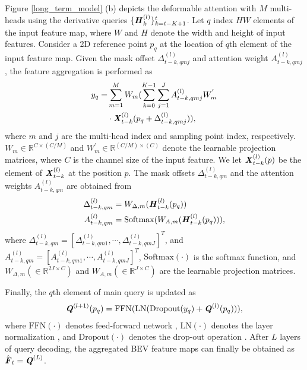 \documentclass[letterpaper]{article} \usepackage{aaai23}  \usepackage{times}  \usepackage{helvet}  \usepackage{courier}  \usepackage[hyphens]{url}  \usepackage{graphicx} \urlstyle{rm} \def\UrlFont{\rm}  \usepackage{natbib}  \usepackage{caption} \frenchspacing  \setlength{\pdfpagewidth}{8.5in} \usepackage{algorithm}
\begin{document}
Figure \ref{long_term_model} (b) depicts the deformable attention with $M$ multi-heads using the derivative queries $\{\textbf{\textit{H}}_{k}^{(l)}\}_{k=t-K+1}^{t}$. 
Let $q$ index $HW$ elements of the input feature map, where $W$ and $H$ denote the width and height of input features. Consider a 2D reference point $p_q$ at the location of $q$th element of the input feature map.
Given the mask offset $\Delta_{t-k,qmj}^{(l)}$ and attention weight $A_{t-k, qmj}^{(l)}$, the feature aggregation is performed as
\begin{align}
    y_q =& \sum_{m=1}^{M}W_m(\sum_{k=0}^{K-1}\sum_{j=1}^{J}A_{t-k, qmj}^{(l)}W_m^{'}  \nonumber \\
    &\cdot \textbf{\textit{X}}_{t-k}^{(l)}(p_q+\Delta_{t-k,qmj}^{(l)})),
\end{align}
where $m$ and $j$ are the multi-head index and sampling point index, respectively. $W_m\in\mathbb{R}^{C \times (C/M)}$ and $W_m^{'}\in\mathbb{R}^{(C/M) \times (C)}$ denote the learnable projection matrices, where $C$ is the channel size of the input feature. We let $\textbf{\textit{X}}_{t-k}^{(l)}(p)$ be the element of $\textbf{\textit{X}}_{t-k}^{(l)}$ at the position $p$. 
The mask offsets $\Delta_{t-k,qm}^{(l)}$ and the attention weights $A_{t-k, qm}^{(l)}$ are obtained from
\begin{align}
    \Delta_{t-k,qm}^{(l)} &= W_{\Delta,m}(\textbf{\textit{H}}_{t-k}^{(l)}(p_q)) \\
    A_{t-k, qm}^{(l)} &= \mathrm{Softmax}(W_{A,m}(\textbf{\textit{H}}_{t-k}^{(l)}(p_q))),
\end{align}
where $\Delta_{t-k,qm}^{(l)}=\left[\Delta_{t-k,qm1}^{(l)},\cdots,\Delta_{t-k,qmJ}^{(l)}\right]^{T}$, and $A_{t-k, qm}^{(l)}=\left[A_{t-k,qm1}^{(l)},\cdots,A_{t-k,qmJ}^{(l)}\right]^{T}$, $\mathrm{Softmax(\cdot)}$ is the softmax function, and $W_{\Delta,m} (\in\mathbb{R}^{2J \times C})$ and $W_{A,m} (\in\mathbb{R}^{J \times C})$ are the learnable projection matrices.

Finally, the $q$th element of main query is updated as
\begin{gather}
    \textbf{\textit{Q}}^{(l+1)}(p_q) = \mathrm{FFN}(\mathrm{LN}(\mathrm{Dropout}(y_q) + \textbf{\textit{Q}}^{(l)}(p_q))),
\end{gather}
where $\mathrm{FFN}(\cdot)$ denotes feed-forward network \cite{attention}, $\mathrm{LN(\cdot)}$ denotes the layer normalization \cite{layernorm}, and $\mathrm{Dropout(\cdot)}$ denotes the drop-out operation \cite{dropout}.
After $L$ layers of query decoding, the aggregated BEV feature maps can finally be obtained as $\hat{\textbf{\textit{F}}}_t = \textbf{\textit{Q}}^{(L)}$.
\end{document}
